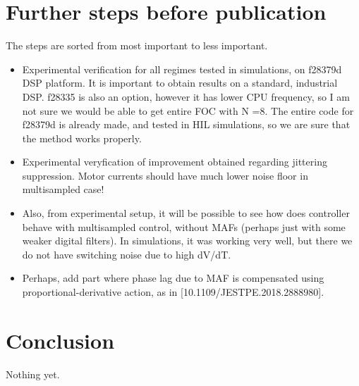 \documentclass[journal]{IEEEtran}
\begin{document}
\section{Further steps before publication}
The steps are sorted from most important to less important.
\begin{itemize}
\item{Experimental verification for all regimes tested in simulations, on f28379d DSP platform. It is important to obtain results on a standard, industrial DSP. f28335 is also an option, however it has lower CPU frequency, so I am not sure we would be able to get entire FOC with N =8. The entire code for f28379d is already made, and tested in HIL simulations, so we are sure that the method works properly.}
\item{Experimental veryfication of improvement obtained regarding jittering suppression. Motor currents should have much lower noise floor in multisampled case!}
\item{Also, from experimental setup, it will be possible to see how does controller behave with multisampled control, without MAFs (perhaps just with some weaker digital filters). In simulations, it was working very well, but there we do not have switching noise due to high dV/dT.}
\item{Perhaps, add part where phase lag due to MAF is compensated using proportional-derivative action, as in [10.1109/JESTPE.2018.2888980].}
\end{itemize}

\section{Conclusion}
Nothing yet.

\ifCLASSOPTIONcaptionsoff
  \newpage
\fi



\end{document}
